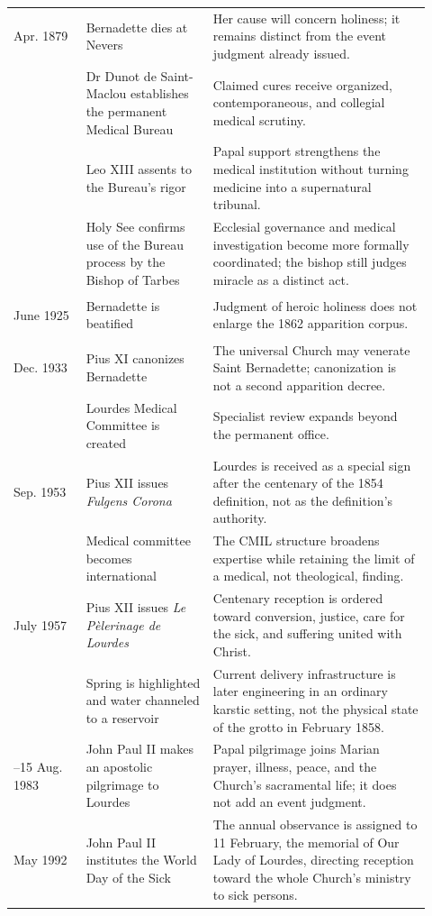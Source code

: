 \begin{longtable}{>{\bfseries\raggedright\arraybackslash}p{0.16\linewidth}>{\raggedright\arraybackslash}p{0.28\linewidth}>{\raggedright\arraybackslash}p{0.48\linewidth}}
16 Apr. 1879 & Bernadette dies at Nevers & Her cause will concern holiness; it remains distinct from the event judgment already issued.\\
1883 & Dr Dunot de Saint-Maclou establishes the permanent Medical Bureau & Claimed cures receive organized, contemporaneous, and collegial medical scrutiny.\\
1886 & Leo XIII assents to the Bureau's rigor & Papal support strengthens the medical institution without turning medicine into a supernatural tribunal.\\
1905 & Holy See confirms use of the Bureau process by the Bishop of Tarbes & Ecclesial governance and medical investigation become more formally coordinated; the bishop still judges miracle as a distinct act.\\
14 June 1925 & Bernadette is beatified & Judgment of heroic holiness does not enlarge the 1862 apparition corpus.\\
8 Dec. 1933 & Pius XI canonizes Bernadette & The universal Church may venerate Saint Bernadette; canonization is not a second apparition decree.\\
1947 & Lourdes Medical Committee is created & Specialist review expands beyond the permanent office.\\
8 Sep. 1953 & Pius XII issues \emph{Fulgens Corona} & Lourdes is received as a special sign after the centenary of the 1854 definition, not as the definition's authority.\\
1954 & Medical committee becomes international & The CMIL structure broadens expertise while retaining the limit of a medical, not theological, finding.\\
2 July 1957 & Pius XII issues \emph{Le Pèlerinage de Lourdes} & Centenary reception is ordered toward conversion, justice, care for the sick, and suffering united with Christ.\\
1974 & Spring is highlighted and water channeled to a reservoir & Current delivery infrastructure is later engineering in an ordinary karstic setting, not the physical state of the grotto in February 1858.\\
14--15 Aug. 1983 & John Paul II makes an apostolic pilgrimage to Lourdes & Papal pilgrimage joins Marian prayer, illness, peace, and the Church's sacramental life; it does not add an event judgment.\\
13 May 1992 & John Paul II institutes the World Day of the Sick & The annual observance is assigned to 11 February, the memorial of Our Lady of Lourdes, directing reception toward the whole Church's ministry to sick persons.\\

\end{longtable}
